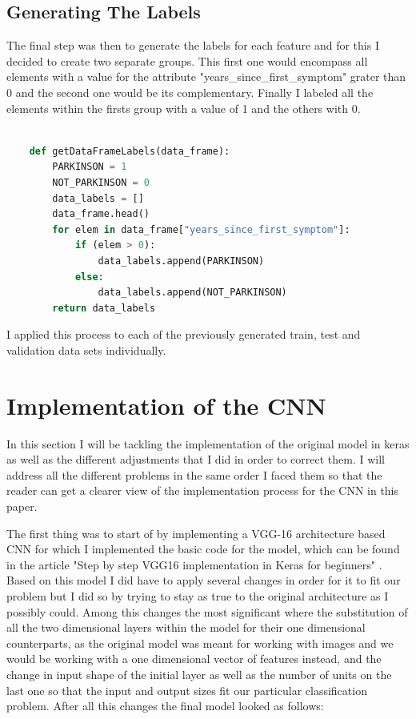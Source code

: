 \documentclass[12pt, a4paper]{article}
\begin{document}
	\clearpage
	
	\subsection{Generating The Labels}
	
	The final step was then to generate the labels for each feature and for this I decided to create two separate groups. This first one would encompass all elements with a value for the attribute "years\_since\_first\_symptom" grater than 0 and the second one  would be its complementary. Finally I labeled all the elements within the firsts group with a value of 1 and the others with 0. 
	
	\vspace{5mm}
	
	\begin{lstlisting}[language=Python]
		
	def getDataFrameLabels(data_frame):
		PARKINSON = 1
		NOT_PARKINSON = 0
		data_labels = []
		data_frame.head()
		for elem in data_frame["years_since_first_symptom"]:
			if (elem > 0):
				data_labels.append(PARKINSON)
			else:
				data_labels.append(NOT_PARKINSON)
		return data_labels
	\end{lstlisting}
	
	I applied this process to each of the previously generated train, test and validation data sets individually. 
	
	\clearpage
	
	\section{Implementation of the CNN}
	
	In this section I will be tackling the implementation of the original model in keras as well as the different adjustments that I did in order to correct them. I will address all the different problems in the same order I faced them so that the reader can get a clearer view of the implementation process for the CNN in this paper.
	
	The first thing was to start of by implementing a VGG-16 architecture based CNN for which I implemented the basic code for the model, which can be found in the article "Step by step VGG16 implementation in Keras for beginners" \cite{VGG16implementation}. Based on this model I did have to apply several changes in order for it to fit our problem but I did so by trying to stay as true to the original architecture as I possibly could. Among this changes the most significant where the substitution of all the two dimensional layers within the model for their one dimensional counterparts, as the original model was meant for working with images and we would be working with a one dimensional vector of features instead, and the change in input shape of the initial layer as well as the number of units on the last one so that the input and output sizes fit our particular classification problem. After all this changes the final model looked as follows:
	
\end{document}
